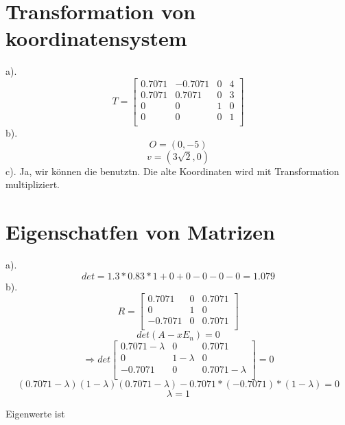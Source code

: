 \documentclass{article}
\begin{document}
\section{Transformation von koordinatensystem}
a).
\[
T=\left[ \begin{array}{cccc}
     0.7071   &  -0.7071     &  0  &  4 \\
     0.7071   &  0.7071      &  0  &  3 \\
     0        &  0           &  1  &  0 \\
     0        &  0           &  0  &  1 \\
\end{array}
\right]
\]
b).
\[
O=(0,-5)
\]
\[
v=(3\sqrt{2},0)
\]
c).
Ja, wir können die benutztn. Die alte Koordinaten wird mit Transformation multipliziert.


\section{Eigenschatfen von Matrizen}
a).
\[
det=1.3*0.83*1+0+0-0-0-0=1.079
\]
b).
\[
R = \left[ \begin{array}{ccc}
    0.7071 &  0       & 0.7071  \\
    0 &  1 &  0 \\
    -0.7071 &  0 &  0.7071 \\
\end{array}
\right]
\]
\[
det(A-xE_{n}) = 0 
\]
\[
\Rightarrow
det\left[ \begin{array}{ccc}
        0.7071-\lambda & 0         & 0.7071  \\
        0              & 1-\lambda & 0 \\
        -0.7071        & 0         & 0.7071-\lambda  \\
\end{array}
\right]=0
\]
\[
(0.7071-\lambda)(1-\lambda)(0.7071-\lambda)-0.7071*(-0.7071)*(1-\lambda)=0
\]
\[
\lambda=1
\]

Eigenwerte ist 
\end{document}
